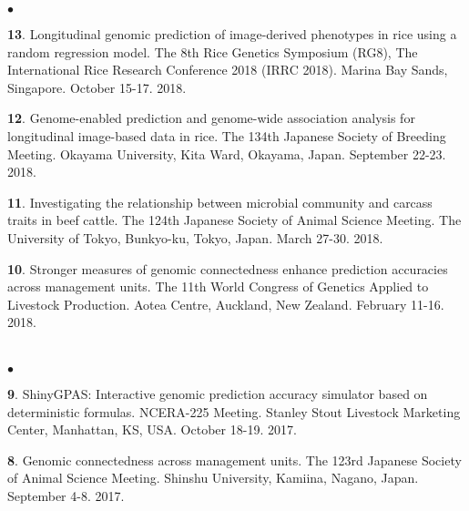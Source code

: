 \documentclass[margin,line,10pt]{res}
\newenvironment{list2}{
  \begin{list}{$\bullet$}{%
      \setlength{\itemsep}{0in}
      \setlength{\parsep}{0in} \setlength{\parskip}{0in}
      \setlength{\topsep}{0in} \setlength{\partopsep}{0in} 
      \setlength{\leftmargin}{0.2in}}}{\end{list}}
\begin{document}
\begin{resume}
\begin{list2}
  \vspace{0.5cm}

\item [{\bf 13}.] Longitudinal genomic prediction of image-derived phenotypes in rice using a random regression model. The 8th Rice Genetics Symposium (RG8), The International Rice Research Conference 2018 (IRRC 2018). Marina Bay Sands, Singapore. October 15-17. 2018.
  
  \vspace{0.5cm}
  
\item [{\bf 12}.] Genome-enabled prediction and genome-wide association analysis for longitudinal image-based data in rice. The 134th Japanese Society of Breeding Meeting. Okayama University, Kita Ward, Okayama, Japan. September 22-23. 2018.
  
  \vspace{0.5cm}

  
  \item [{\bf 11}.] Investigating the relationship between microbial community and carcass traits in beef cattle.  The 124th Japanese Society of Animal Science Meeting. The University of Tokyo, Bunkyo-ku, Tokyo, Japan. March 27-30. 2018.

    
    \vspace{0.5cm}

          
\item [{\bf 10}.] Stronger measures of genomic connectedness enhance prediction accuracies across management units. The 11th World Congress of Genetics Applied to Livestock Production.  Aotea Centre, Auckland, New Zealand. February 11-16. 2018.

\end{list2}  





\section{}
\begin{list2}

  \item [{\bf 9}.] ShinyGPAS: Interactive genomic prediction accuracy simulator based on deterministic formulas. NCERA-225 Meeting. Stanley Stout Livestock Marketing Center, Manhattan, KS, USA. October 18-19. 2017.

      \vspace{0.5cm}

  \item [{\bf 8}.] Genomic connectedness across management units. The 123rd Japanese Society of Animal Science Meeting. Shinshu University, Kamiina, Nagano, Japan. September 4-8. 2017.


\end{list2}
\end{resume}
\end{document}
